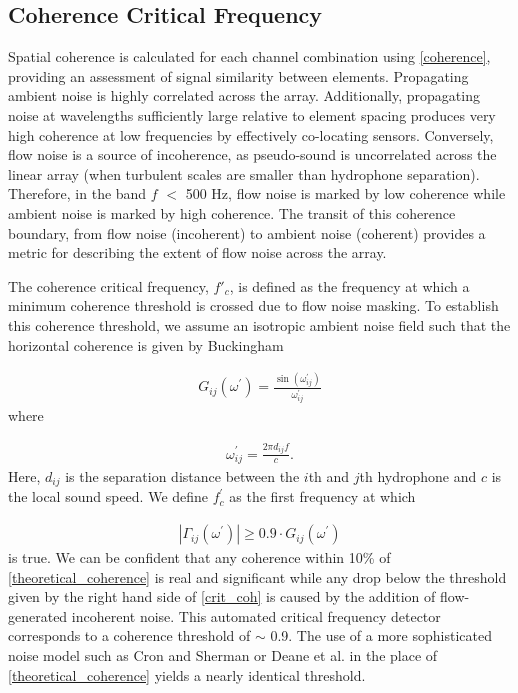 \documentclass[12pt,journal,onecolumn]{IEEEtran}
\begin{document}
\subsection{Coherence Critical Frequency}
Spatial coherence is calculated for each channel combination using \eqref{coherence}, providing an assessment of signal similarity between elements. Propagating ambient noise is highly correlated across the array. Additionally, propagating noise at wavelengths sufficiently large relative to element spacing produces very high coherence at low frequencies by effectively co-locating sensors. Conversely, flow noise is a source of incoherence, as pseudo-sound is uncorrelated across the linear array (when turbulent scales are smaller than hydrophone separation). Therefore, in the band $f$ $<$ 500 Hz, flow noise is marked by low coherence while ambient noise is marked by high coherence. The transit of this coherence boundary, from flow noise (incoherent) to ambient noise (coherent) provides a metric for describing the extent of flow noise across the array. 

The coherence critical frequency, $f'_c$, is defined as the frequency at which a minimum coherence threshold is crossed due to flow noise masking. To establish this coherence threshold, we assume an isotropic ambient noise field such that the horizontal coherence is given by Buckingham \cite{buck}

\begin{align}
G_{ij}(\omega^\prime) = \frac{\sin (\omega_{ij}^\prime)}{\omega_{ij}^\prime}
\label{theoretical_coherence}
\end{align}
where

\begin{align}
\omega_{ij}^\prime = \frac{2\pi d_{ij}f }{c}.
\label{w}
\end{align}
Here, $d_{ij}$ is the separation distance between the $i$th and $j$th hydrophone and $c$ is the local sound speed. We define $f^\prime_c$ as the first frequency at which 

\begin{align}
|\Gamma_{ij}(\omega^\prime)|\geq  0.9\cdot G_{ij}(\omega^\prime)
\label{crit_coh}
\end{align}
is true. 
We can be confident that any coherence within 10\% of \eqref{theoretical_coherence} is real and significant while any drop below the threshold given by the right hand side of \eqref{crit_coh} is caused by the addition of flow-generated incoherent noise. 
This automated critical frequency detector corresponds to a coherence threshold of $\sim$ 0.9. The use of a more sophisticated noise model such as Cron and Sherman \cite{cron} or Deane et al. \cite{deane} in the place of \eqref{theoretical_coherence} yields a nearly identical threshold.
\end{document}
